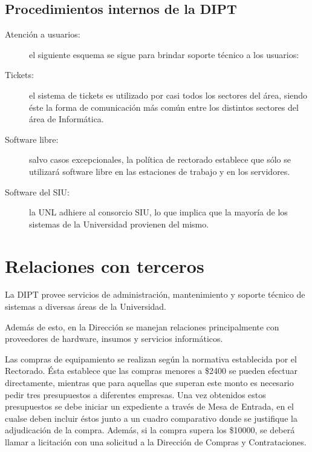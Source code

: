 \documentclass[a4paper,11pt,oneside]{article}
\begin{document}
\subsection{Procedimientos internos de la DIPT}
%
\begin{description}
\item[Atención a usuarios:] el siguiente esquema se sigue para brindar
  soporte técnico a los usuarios:
\item[Tickets:] el sistema de tickets es utilizado por casi todos los
  sectores del área, siendo éste la forma de comunicación más
  común entre los distintos sectores del área de Informática.
\item[Software libre:] salvo casos excepcionales, la política de
  rectorado establece que sólo se utilizará software libre en las
  estaciones de trabajo y en los servidores.
\item[Software del SIU:] la UNL adhiere al consorcio SIU, lo que
  implica que la mayoría de los sistemas de la Universidad provienen
  del mismo.
\end{description}
%
\newpage
\section{Relaciones con terceros}
La DIPT provee servicios de administración, mantenimiento y soporte
técnico de sistemas a diversas áreas de la Universidad.

Además de esto, en la Dirección se manejan relaciones principalmente
con proveedores de hardware, insumos y servicios informáticos.

Las compras de equipamiento se realizan según la normativa establecida
por el Rectorado.  Ésta establece que las compras menores a \$2400 se
pueden efectuar directamente, mientras que para aquellas que superan
este monto es necesario pedir tres presupuestos a diferentes empresas.
Una vez obtenidos estos presupuestos se debe iniciar un expediente a
través de Mesa de Entrada, en el cualse deben incluir éstos junto a un
cuadro comparativo donde se justifique la adjudicación de la
compra. Además, si la compra supera los \$10000, se deberá llamar a
licitación con una solicitud a la Dirección de Compras y
Contrataciones.
%
\end{document}
